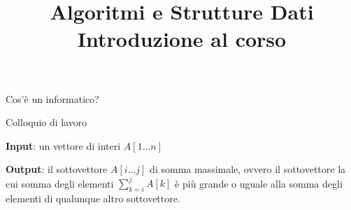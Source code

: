 

\usepackage{epigraph}
\usepackage{listings}
\usepackage{colortbl}


\newcommand{\Sum}{\mathit{sum}}
\newcommand{\MaxSoFar}{\mathit{maxSoFar}}
\newcommand{\MaxEndingHere}{\mathit{maxEndingHere}}

\newcommand*{\RC}[1]{\hfill\makebox[3.0cm][l]{#1}}%


\title[ASD - Introduzione]{\textbf{Algoritmi e Strutture Dati}\\[24pt]Introduzione al corso}

\graphicspath{{figs/00/}}



\FrameTitle{}

\begin{frame}{Cos'è un informatico?}
\end{frame}

\begin{frame}{Colloquio di lavoro}
	
\vspace{-9pt}
\begin{myboxtitle}
\BI
\item \textbf{Input}: un vettore di interi $A[1 \ldots n]$
\item \textbf{Output}: il sottovettore $A[i \ldots j]$ di somma massimale,
ovvero il sottovettore la cui somma degli elementi $\sum_{k=i}^j A[k]$ è
più grande o uguale alla somma degli elementi di qualunque altro sottovettore.
\EI
\end{myboxtitle}
\end{frame}


